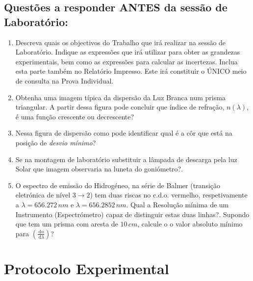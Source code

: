 \documentclass[a4paper,12pt]{article}  %
\newcommand{\ud}{\,\mathrm{d}}
\begin{document}
\subsection{\sf Questões a responder ANTES da sessão de Laboratório:}
\begin{enumerate}
\item Descreva quais os objectivos do Trabalho que irá realizar na sessão de Laboratório. Indique as expressões que irá utilizar para obter as grandezas experimentais, bem como as expressões para calcular as incertezas. Inclua esta parte também no Relatório Impresso. Este irá constituir o ÚNICO meio de consulta na Prova Individual.
\item Obtenha uma imagem típica da dispersão da Luz Branca num prisma triangular. A partir dessa figura pode concluir que índice de refração, $n(\lambda)$, é uma função crescente ou decrescente?
\item Nessa figura de dispersão como pode identificar qual é a côr que está na posição de \emph{desvio mínimo}?
\item Se na montagem de laboratório substituir a lâmpada de descarga pela luz Solar que imagem observaria na luneta do goniómetro?. 
\item O espectro de emissão do Hidrogéneo, na série de Balmer (transição eletrónica de nível $3 \to 2$) tem duas riscas no c.d.o. vermelho, respetivamente a $\lambda = 656.272\, nm$ e $\lambda = 656.2852\,nm$.
Qual a Resolução mínima de um Instrumento (Espectrómetro) capaz de distinguir estas duas linhas?. Supondo que tem um prisma com aresta de $10\,cm$, calcule o 
o valor absoluto mínimo para $\left(\frac{\ud n}{\ud \lambda} \right)$?
\end{enumerate}


\section{\sf Protocolo Experimental}
\end{document}
